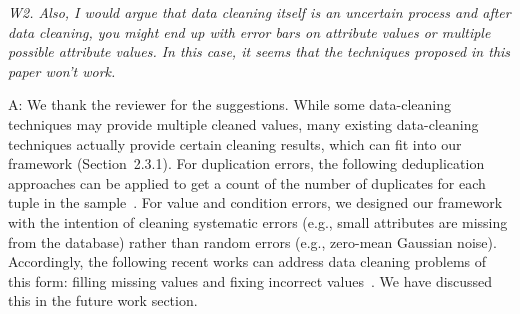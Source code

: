


\mbox{}

\emph{W2. Also, I would argue that data cleaning itself is an uncertain process and after data cleaning, you might end up with error bars on attribute values or multiple possible attribute values. In this case, it seems that the techniques proposed in this paper won't work.}


A: We thank the reviewer for the suggestions. 
While some data-cleaning techniques may provide multiple cleaned values, many existing data-cleaning techniques actually provide certain cleaning results, which can fit into our framework (Section~2.3.1). For duplication errors, the following deduplication approaches can be applied to get a count of the number of duplicates for each tuple in the sample~\cite{elfeky2002tailor, conf/hdkm/Christen08, DBLP:conf/kdd/BilenkoM03, benjelloun2009swoosh}. 
For value and condition errors, we designed our framework with the intention of cleaning systematic errors (e.g., small attributes are missing from the database) rather than random errors (e.g., zero-mean Gaussian noise). 
Accordingly, the following recent works can address data cleaning problems of this form: filling missing values \cite{conf/icde/BethTMP13, parkcrowdfill} and fixing incorrect values~\cite{DBLP:journals/pvldb/YakoutENOI11, fan2012foundations,DBLP:conf/sigmod/DallachiesaEEEIOT13}. We have discussed this in the future work section. 


